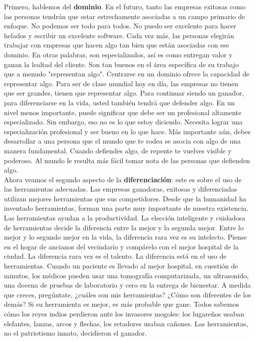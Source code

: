 \documentclass[10pt]{book}
\begin{document}
Primero, hablemos del \textbf{dominio}. En el futuro, tanto las empresas exitosas como las personas tendrán que estar estrechamente asociadas a un campo primario de enfoque. No podemos ser todo para todos. No puedo ser excelente para hacer helados y escribir un excelente software. Cada vez más, las personas elegirán trabajar con empresas que hacen algo tan bien que están asociadas con ese dominio. En otras palabras, son especializados, así es como entregan valor y ganan la lealtad del cliente. Son tan buenos en el área específica de su trabajo que a menudo "representan algo". Centrarse en un dominio ofrece la capacidad de representar algo. Para ser de clase mundial hoy en día, las empresas no tienen que ser grandes, tienen que representar algo. Para continuar siendo un ganador, para diferenciarse en la vida, usted también tendrá que defender algo. En un nivel menos importante, puede significar que debe ser un profesional altamente especializado. Sin embargo, eso no es lo que estoy diciendo. Necesita lograr una especialización profesional y ser bueno en lo que hace. Más importante aún, debes desarrollar a una persona que el mundo que te rodea se asocia con algo de una manera fundamental. Cuando defiendes algo, de repente te vuelves visible y poderoso. Al mundo le resulta más fácil tomar nota de las personas que defienden algo.\\
Ahora veamos el segundo aspecto de la \textbf{diferenciación}: este es sobre el uso de las herramientas adecuadas. Las empresas ganadoras, exitosas y diferenciadas utilizan mejores herramientas que sus competidores. Desde que la humanidad ha inventado herramientas, forman una parte muy importante de nuestra existencia. Las herramientas ayudan a la productividad. La elección inteligente y cuidadosa de herramientas decide la diferencia entre la mejor y la segunda mejor. Entre lo mejor y lo segundo mejor en la vida, la diferencia rara vez es su intelecto. Piense en el hogar de ancianos del vecindario y compárelo con el mejor hospital de la ciudad. La diferencia rara vez es el talento. La diferencia está en el uso de herramientas. Cuando un paciente es llevado al mejor hospital, en cuestión de minutos, los médicos pueden usar una tomografía computarizada, un ultrasonido, una docena de pruebas de laboratorio y cero en la entrega de bienestar. A medida que creces, pregúntate, ¿cuáles son mis herramientas? ¿Cómo son diferentes de los demás? Si su herramienta es mejor, es más probable que gane. Todos sabemos cómo los reyes indios perdieron ante los invasores mogoles: los lugareños usaban elefantes, lanzas, arcos y flechas, los retadores usaban cañones. Las herramientas, no el patriotismo innato, decidieron el ganador.\\
\end{document}
